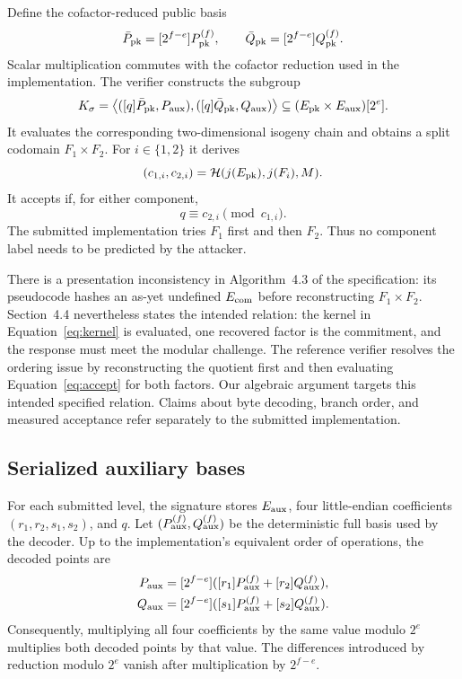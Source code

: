 \documentclass[11pt,a4paper]{article}
\newcommand{\Hash}{\mathcal{H}}
\begin{document}
Define the cofactor-reduced public basis
\[
  \bar P_{\rm pk}=[2^{f-e}]P^{(f)}_{\rm pk},\qquad
  \bar Q_{\rm pk}=[2^{f-e}]Q^{(f)}_{\rm pk}.
\]
Scalar multiplication commutes with the cofactor reduction used in the
implementation. The verifier constructs the subgroup
\begin{equation}
 K_\sigma=\left\langle
   ([q]\bar P_{\rm pk},P_{\rm aux}),
   ([q]\bar Q_{\rm pk},Q_{\rm aux})
 \right\rangle
 \subseteq
 (E_{\rm pk}\times E_{\rm aux})[2^e].
 \label{eq:kernel}
\end{equation}
It evaluates the corresponding two-dimensional isogeny chain and obtains a
split codomain $F_1\times F_2$. For $i\in\{1,2\}$ it derives
\begin{equation}
 (c_{1,i},c_{2,i})=
 \Hash(j(E_{\rm pk}),j(F_i),M).
 \label{eq:hash}
\end{equation}
It accepts if, for either component,
\begin{equation}
                         q\equiv c_{2,i}\pmod{c_{1,i}}.
 \label{eq:accept}
\end{equation}
The submitted implementation tries $F_1$ first and then $F_2$. Thus no
component label needs to be predicted by the attacker.

There is a presentation inconsistency in Algorithm~4.3 of the specification:
its pseudocode hashes an as-yet undefined $E_{\rm com}$ before reconstructing
$F_1\times F_2$. Section~4.4 nevertheless states the intended relation: the
kernel in Equation~\eqref{eq:kernel} is evaluated, one recovered factor is the
commitment, and the response must meet the modular challenge. The reference
verifier resolves the ordering issue by reconstructing the quotient first and
then evaluating Equation~\eqref{eq:accept} for both factors. Our algebraic
argument targets this intended specified relation. Claims about byte decoding,
branch order, and measured acceptance refer separately to the submitted
implementation.

\subsection{Serialized auxiliary bases}

For each submitted level, the signature stores $E_{\rm aux}$, four little-endian
coefficients $(r_1,r_2,s_1,s_2)$, and $q$. Let
$(P^{(f)}_{\rm aux},Q^{(f)}_{\rm aux})$ be the deterministic full basis used by
the decoder. Up to the implementation's equivalent order of operations, the
decoded points are
\begin{align}
 P_{\rm aux}&=[2^{f-e}]
   ([r_1]P^{(f)}_{\rm aux}+[r_2]Q^{(f)}_{\rm aux}),\label{eq:decode-p}\\
 Q_{\rm aux}&=[2^{f-e}]
   ([s_1]P^{(f)}_{\rm aux}+[s_2]Q^{(f)}_{\rm aux}).\label{eq:decode-q}
\end{align}
Consequently, multiplying all four coefficients by the same value modulo
$2^e$ multiplies both decoded points by that value. The differences introduced
by reduction modulo $2^e$ vanish after multiplication by $2^{f-e}$.
\end{document}
